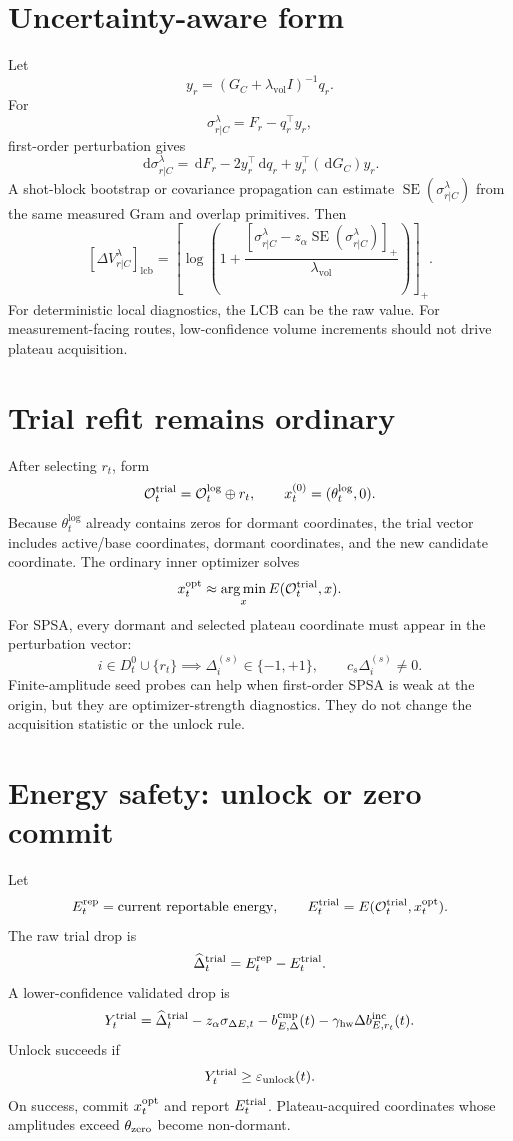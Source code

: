 \documentclass[10pt,twocolumn]{article}
\newcommand{\argmin}{\operatorname*{arg\,min}}
\newcommand{\eps}{\varepsilon}
\newcommand{\lcb}{\mathrm{lcb}}
\newcommand{\logi}{\mathrm{log}}
\newcommand{\vol}{\mathrm{vol}}
\newcommand{\dd}{\,\mathrm d}
\begin{document}
\section{Uncertainty-aware form}

Let
\[
y_r=(G_C+\lambda_{\vol}I)^{-1}q_r.
\]
For
\[
\sigma_{r|C}^{\lambda}=F_r-q_r^\top y_r,
\]
first-order perturbation gives
\[
\dd\sigma_{r|C}^{\lambda}
=\dd F_r-2y_r^\top\dd q_r+y_r^\top(\dd G_C)y_r.
\]
A shot-block bootstrap or covariance propagation can estimate
$\operatorname{SE}(\sigma_{r|C}^{\lambda})$ from the same measured Gram and
overlap primitives. Then
\[
[\Delta V_{r|C}^{\lambda}]_{\lcb}
=\left[\log\left(1+
\frac{[\sigma_{r|C}^{\lambda}-z_\alpha\operatorname{SE}(\sigma_{r|C}^{\lambda})]_+}
{\lambda_{\vol}}
\right)\right]_+.
\]
For deterministic local diagnostics, the LCB can be the raw value. For
measurement-facing routes, low-confidence volume increments should not drive
plateau acquisition.

\section{Trial refit remains ordinary}

After selecting $r_t$, form
\[
\mathcal O_t^{\rm trial}=\mathcal O_t^{\logi}\oplus r_t,
\qquad
x_t^{(0)}=(\theta_t^{\logi},0).
\]
Because $\theta_t^{\logi}$ already contains zeros for dormant coordinates, the
trial vector includes active/base coordinates, dormant coordinates, and the new
candidate coordinate. The ordinary inner optimizer solves
\[
x_t^{\rm opt}\approx\argmin_x E(\mathcal O_t^{\rm trial},x).
\]
For SPSA, every dormant and selected plateau coordinate must appear in the
perturbation vector:
\[
i\in D_t^0\cup\{r_t\}\implies
\Delta_i^{(s)}\in\{-1,+1\},\qquad c_s\Delta_i^{(s)}\ne0.
\]
Finite-amplitude seed probes can help when first-order SPSA is weak at the
origin, but they are optimizer-strength diagnostics. They do not change the
acquisition statistic or the unlock rule.

\section{Energy safety: unlock or zero commit}

Let
\[
E_t^{\rm rep}=\text{current reportable energy},
\qquad
E_t^{\rm trial}=E(\mathcal O_t^{\rm trial},x_t^{\rm opt}).
\]
The raw trial drop is
\[
\widehat\Delta_t^{\rm trial}=E_t^{\rm rep}-E_t^{\rm trial}.
\]
A lower-confidence validated drop is
\[
Y_t^{\rm trial}=\widehat\Delta_t^{\rm trial}
-z_\alpha\sigma_{\Delta E,t}
-b_{E,\Delta}^{\rm cmp}(t)
-\gamma_{\rm hw}\Delta b_{E,r_t}^{\rm inc}(t).
\]
Unlock succeeds if
\[
Y_t^{\rm trial}\ge\eps_{\rm unlock}(t).
\]
On success, commit $x_t^{\rm opt}$ and report $E_t^{\rm trial}$. Plateau-acquired
coordinates whose amplitudes exceed $\theta_{\rm zero}$ become non-dormant.
\end{document}
